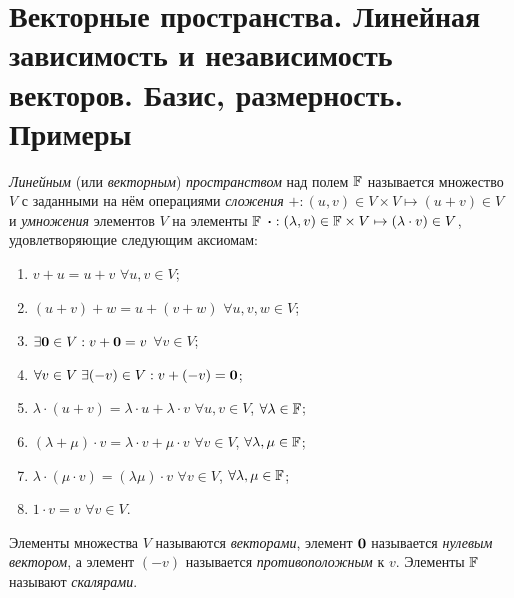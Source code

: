 \section{Векторные пространства. Линейная зависимость и независимость векторов. Базис, размерность. Примеры}

\begin{definition}
    \textit{Линейным} (или \textit{векторным}) \textit{пространством} над полем $\mathbb{F}$ называется множество $V$ с заданными на нём операциями \textit{сложения} $+: (u, v) \in V \times V \mapsto (u + v) \in V$ и \textit{умножения} элементов $V$ на элементы $\mathbb{F}$ $\boldsymbol{\cdot}: (\lambda, v) \in \mathbb{F} \times V \mapsto (\lambda \cdot v) \in V$, удовлетворяющие следующим аксиомам:
    \begin{enumerate}
        \item $v + u = u + v$ $\forall u, v \in V$;
        \item $(u + v) + w = u + (v + w)$ $\forall u, v, w \in V$;
        \item $\exists \boldsymbol{0} \in V: v + \boldsymbol{0} = v$ $\forall v \in V$;\hspace{2.9cm}
        \item $\forall v \in V\;\exists (-v) \in V: v + (-v) = \boldsymbol{0}$;
        \item $\lambda \cdot (u + v) = \lambda \cdot u + \lambda \cdot v$ $\forall u, v \in V$, $\forall \lambda \in \mathbb{F}$;
        \item $(\lambda + \mu) \cdot v = \lambda \cdot v + \mu \cdot v$ $\forall v \in V$, $\forall \lambda, \mu \in \mathbb{F}$;
        \item $\lambda \cdot (\mu \cdot v) = (\lambda\mu) \cdot v$ $\forall v \in V$, $\forall \lambda, \mu \in \mathbb{F}$;\hspace{1cm}
        \item $1 \cdot v = v$ $\forall v \in V$.
    \end{enumerate}
\end{definition}

\begin{definition}
    Элементы множества $V$ называются \textit{векторами}, элемент $\boldsymbol{0}$ называется \textit{нулевым вектором}, а элемент $(-v)$ называется \textit{противоположным} к $v$. Элементы $\mathbb{F}$ называют \textit{скалярами}.
\end{definition}

